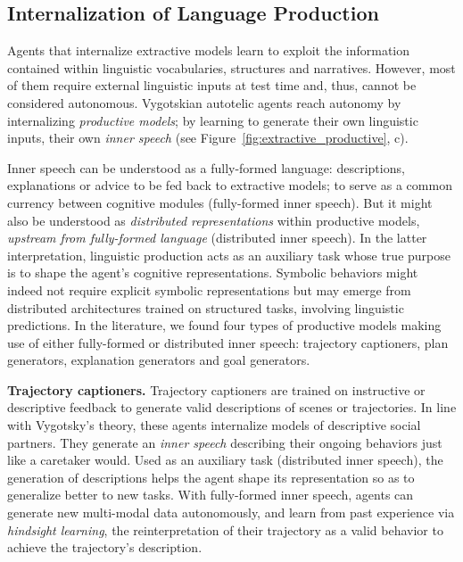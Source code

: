 \subsection{Internalization of Language Production}
\label{sec:production}

Agents that internalize extractive models learn to exploit the information contained within linguistic vocabularies, structures and narratives. However, most of them require external linguistic inputs at test time and, thus, cannot be considered autonomous. Vygotskian autotelic agents reach autonomy by internalizing \textit{productive models}; \ie by learning to generate their own linguistic inputs, their own \textit{inner speech} (see Figure~\ref{fig:extractive_productive}, c). 

Inner speech can be understood as a fully-formed language: descriptions, explanations or advice to be fed back to extractive models; to serve as a common currency between cognitive modules (fully-formed inner speech).\cite{zeng2022socratic} But it might also be understood as \textit{distributed representations} within productive models, \textit{upstream from fully-formed language} (distributed inner speech). In the latter interpretation, linguistic production acts as an auxiliary task whose true purpose is to shape the agent's cognitive representations. Symbolic behaviors might indeed not require explicit symbolic representations but may emerge from distributed architectures trained on structured tasks, \eg involving linguistic predictions.\cite{mcclelland2010letting,santoro2021symbolic} 
In the literature, we found four types of productive models making use of either fully-formed or distributed inner speech: trajectory captioners, plan generators, explanation generators and goal generators. 

\textbf{Trajectory captioners.} Trajectory captioners are trained on instructive or descriptive feedback to generate valid descriptions of scenes or trajectories.\cite{cideron_higher_2020, zhou_inverse_2020, colas_language_2020, nguyen2021interactive, yan2022intra} In line with Vygotsky's theory, these agents internalize models of descriptive social partners. They generate an \textit{inner speech} describing their ongoing behaviors just like a caretaker would. Used as an auxiliary task (distributed inner speech), the generation of descriptions helps the agent shape its representation so as to generalize better to new tasks.\cite{yan2022intra} With fully-formed inner speech, agents can generate new multi-modal data autonomously, and learn from past experience via \textit{hindsight learning},\cite{andrychowicz_hindsight_2017} \ie the reinterpretation of their trajectory as a valid behavior to achieve the trajectory's description.\cite{zhou_inverse_2020, colas_language_2020, nguyen2021interactive}


